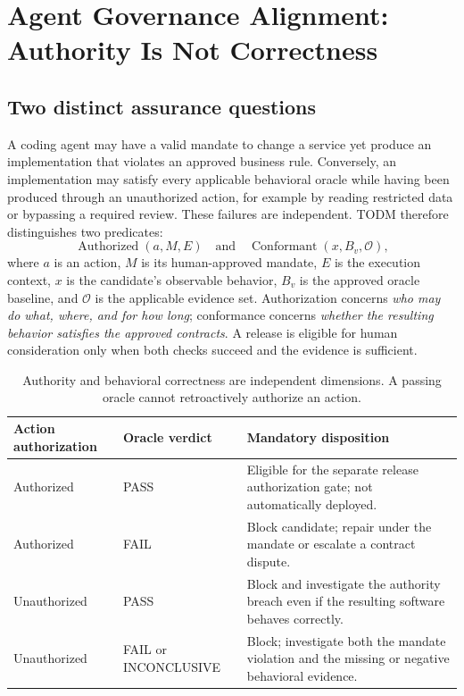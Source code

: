 \documentclass[11pt,a4paper]{article}
\newcommand{\PASS}{\textsf{PASS}}
\newcommand{\FAIL}{\textsf{FAIL}}
\newcommand{\INC}{\textsf{INCONCLUSIVE}}
\begin{document}
\section{Agent Governance Alignment: Authority Is Not Correctness}
\subsection{Two distinct assurance questions}
A coding agent may have a valid mandate to change a service yet produce an implementation that violates an approved business rule. Conversely, an implementation may satisfy every applicable behavioral oracle while having been produced through an unauthorized action, for example by reading restricted data or bypassing a required review. These failures are independent. TODM therefore distinguishes two predicates:
\begin{equation}
  \operatorname{Authorized}(a,M,E) \quad\text{and}\quad
  \operatorname{Conformant}(x,B_v,\mathcal{O}),
\end{equation}
where $a$ is an action, $M$ is its human-approved mandate, $E$ is the execution context, $x$ is the candidate's observable behavior, $B_v$ is the approved oracle baseline, and $\mathcal{O}$ is the applicable evidence set. Authorization concerns \emph{who may do what, where, and for how long}; conformance concerns \emph{whether the resulting behavior satisfies the approved contracts}. A release is eligible for human consideration only when both checks succeed and the evidence is sufficient.

\begin{table}[htbp]
\centering\small
\caption{Authority and behavioral correctness are independent dimensions. A passing oracle cannot retroactively authorize an action.}
\begin{tabularx}{\linewidth}{@{}p{28mm}p{30mm}X@{}}
\toprule
Action authorization & Oracle verdict & Mandatory disposition \\
\midrule
Authorized & \PASS{} & Eligible for the separate release authorization gate; not automatically deployed. \\
Authorized & \FAIL{} & Block candidate; repair under the mandate or escalate a contract dispute. \\
Unauthorized & \PASS{} & Block and investigate the authority breach even if the resulting software behaves correctly. \\
Unauthorized & \FAIL{} or \INC{} & Block; investigate both the mandate violation and the missing or negative behavioral evidence. \\
\bottomrule
\end{tabularx}
\label{tab:authority}
\end{table}
\end{document}
